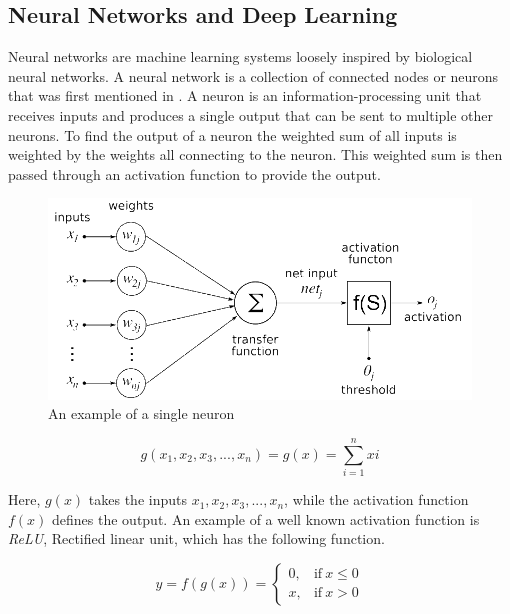 \documentclass[nofilelist]{cslthse-msc}
\begin{document}
\subsection{Neural Networks and Deep Learning}

Neural networks are machine learning systems loosely inspired by biological neural networks. A neural network is a collection of connected nodes or neurons that was first mentioned in \citet{mcculloch1943}. A neuron \citep{dawson1998ann} is an information-processing unit that receives inputs and produces a single output that can be sent to multiple other neurons. To find the output of a neuron the weighted sum of all inputs is weighted by the weights all connecting to the neuron. This weighted sum is then passed through an activation function to provide the output.



\begin{figure}[htp]
    \centering
    \includegraphics[width=12cm]{msccls/explanatory_images/single_neuron.png}
    \caption{An example of a single neuron}
    \label{fig:neuron}
\end{figure}


\begin{equation}
    g(x_1, x_2, x_3,...,x_n) = g(x) = \sum_{i=1}^n  xi
\end{equation}

Here, $g(x)$ takes the inputs $x_1, x_2, x_3,...,x_n$, while the activation function $f(x)$ defines the output. An example of a well known activation function is \textit{ReLU}, Rectified linear unit, which has the following function. 

\begin{equation}
y = f(g(x)) =
\begin{cases}
  0, & \text{if}\ x \leq 0 \\
  x, & \text{if}\ x > 0
\end{cases}
\end{equation}
\end{document}
